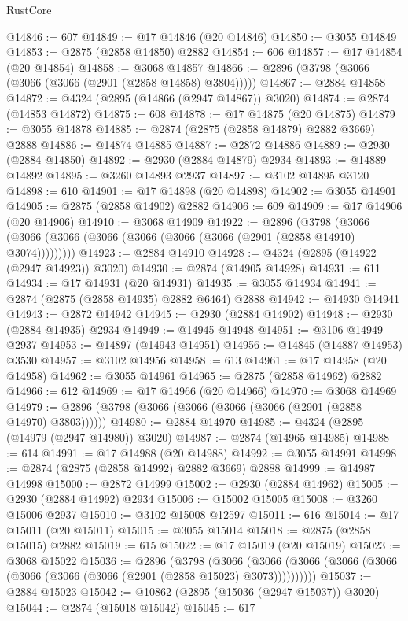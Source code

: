 \begin{lexlean}{RustCore}
\begin{coremodule}
@14846 := 607
@14849 := @17 @14846 (@20 @14846)
@14850 := @3055 @14849
@14853 := @2875 (@2858 @14850) @2882
@14854 := 606
@14857 := @17 @14854 (@20 @14854)
@14858 := @3068 @14857
@14866 := @2896 (@3798 (@3066 (@3066 (@3066 (@2901 (@2858 @14858) @3804)))))
@14867 := @2884 @14858
@14872 := @4324 (@2895 (@14866 (@2947 @14867)) @3020)
@14874 := @2874 (@14853 @14872)
@14875 := 608
@14878 := @17 @14875 (@20 @14875)
@14879 := @3055 @14878
@14885 := @2874 (@2875 (@2858 @14879) @2882 @3669) @2888
@14886 := @14874 @14885
@14887 := @2872 @14886
@14889 := @2930 (@2884 @14850)
@14892 := @2930 (@2884 @14879) @2934
@14893 := @14889 @14892
@14895 := @3260 @14893 @2937
@14897 := @3102 @14895 @3120
@14898 := 610
@14901 := @17 @14898 (@20 @14898)
@14902 := @3055 @14901
@14905 := @2875 (@2858 @14902) @2882
@14906 := 609
@14909 := @17 @14906 (@20 @14906)
@14910 := @3068 @14909
@14922 := @2896
    (@3798 (@3066 (@3066 (@3066 (@3066 (@3066 (@3066 (@3066 (@2901 (@2858 @14910) @3074)))))))))
@14923 := @2884 @14910
@14928 := @4324 (@2895 (@14922 (@2947 @14923)) @3020)
@14930 := @2874 (@14905 @14928)
@14931 := 611
@14934 := @17 @14931 (@20 @14931)
@14935 := @3055 @14934
@14941 := @2874 (@2875 (@2858 @14935) @2882 @6464) @2888
@14942 := @14930 @14941
@14943 := @2872 @14942
@14945 := @2930 (@2884 @14902)
@14948 := @2930 (@2884 @14935) @2934
@14949 := @14945 @14948
@14951 := @3106 @14949 @2937
@14953 := @14897 (@14943 @14951)
@14956 := @14845 (@14887 @14953) @3530
@14957 := @3102 @14956
@14958 := 613
@14961 := @17 @14958 (@20 @14958)
@14962 := @3055 @14961
@14965 := @2875 (@2858 @14962) @2882
@14966 := 612
@14969 := @17 @14966 (@20 @14966)
@14970 := @3068 @14969
@14979 := @2896 (@3798 (@3066 (@3066 (@3066 (@3066 (@2901 (@2858 @14970) @3803))))))
@14980 := @2884 @14970
@14985 := @4324 (@2895 (@14979 (@2947 @14980)) @3020)
@14987 := @2874 (@14965 @14985)
@14988 := 614
@14991 := @17 @14988 (@20 @14988)
@14992 := @3055 @14991
@14998 := @2874 (@2875 (@2858 @14992) @2882 @3669) @2888
@14999 := @14987 @14998
@15000 := @2872 @14999
@15002 := @2930 (@2884 @14962)
@15005 := @2930 (@2884 @14992) @2934
@15006 := @15002 @15005
@15008 := @3260 @15006 @2937
@15010 := @3102 @15008 @12597
@15011 := 616
@15014 := @17 @15011 (@20 @15011)
@15015 := @3055 @15014
@15018 := @2875 (@2858 @15015) @2882
@15019 := 615
@15022 := @17 @15019 (@20 @15019)
@15023 := @3068 @15022
@15036 := @2896
    (@3798
      (@3066 (@3066 (@3066 (@3066 (@3066 (@3066 (@3066 (@3066 (@2901 (@2858 @15023) @3073))))))))))
@15037 := @2884 @15023
@15042 := @10862 (@2895 (@15036 (@2947 @15037)) @3020)
@15044 := @2874 (@15018 @15042)
@15045 := 617

\end{coremodule}
\end{lexlean}
